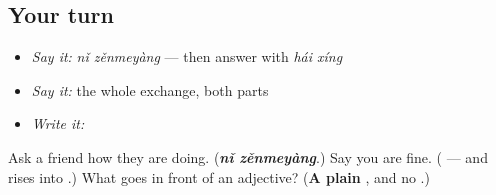 \subsection*{Your turn}
\begin{itemize}
\raggedright
  \item \emph{Say it:} \emph{nǐ zěnmeyàng} — then answer with \emph{hái xíng}
  \item \emph{Say it:} the whole exchange, both parts
  \item \emph{Write it:} 
\end{itemize}

\begin{tcolorbox}[breakable,colback=teal!4,colframe=teal!35!black,title={Before you move on}]
Ask a friend how they are doing. (\emph{\textbf{nǐ zěnmeyàng}}.) Say you are fine. (\textbf{} — and  rises into .) What goes in front of an adjective? (\textbf{A plain }, and no .)
\end{tcolorbox}
